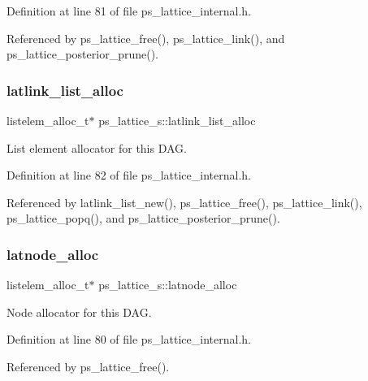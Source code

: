Definition at line 81 of file ps\+\_\+lattice\+\_\+internal.\+h.



Referenced by ps\+\_\+lattice\+\_\+free(), ps\+\_\+lattice\+\_\+link(), and ps\+\_\+lattice\+\_\+posterior\+\_\+prune().

\mbox{\label{structps__lattice__s_a8e9cfaf92f9a3588d018578854c61e88}} 
\subsubsection{latlink\+\_\+list\+\_\+alloc}
{\footnotesize\ttfamily listelem\+\_\+alloc\+\_\+t$\ast$ ps\+\_\+lattice\+\_\+s\+::latlink\+\_\+list\+\_\+alloc}



List element allocator for this D\+AG. 



Definition at line 82 of file ps\+\_\+lattice\+\_\+internal.\+h.



Referenced by latlink\+\_\+list\+\_\+new(), ps\+\_\+lattice\+\_\+free(), ps\+\_\+lattice\+\_\+link(), ps\+\_\+lattice\+\_\+popq(), and ps\+\_\+lattice\+\_\+posterior\+\_\+prune().

\mbox{\label{structps__lattice__s_a14e4e87550647d5119cd1cc48ff4f3f1}} 
\subsubsection{latnode\+\_\+alloc}
{\footnotesize\ttfamily listelem\+\_\+alloc\+\_\+t$\ast$ ps\+\_\+lattice\+\_\+s\+::latnode\+\_\+alloc}



Node allocator for this D\+AG. 



Definition at line 80 of file ps\+\_\+lattice\+\_\+internal.\+h.



Referenced by ps\+\_\+lattice\+\_\+free().

\mbox{\label{structps__lattice__s_a28f4ff5039e0961d57331d2605801010}} 

